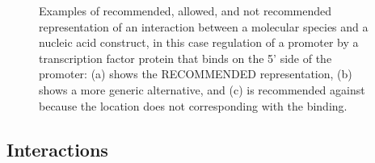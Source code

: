 \begin{enumerate}
	\begin{figure}[h!]
	\centering
	\caption{Examples of recommended, allowed, and not recommended representation of an interaction between a molecular species and a nucleic acid construct, in this case regulation of a promoter by a transcription factor protein that binds on the 5' side of the promoter: 
	(a) shows the RECOMMENDED representation, (b) shows a more generic alternative, and (c) is recommended against because the location does not corresponding with the binding.}
	\label{exa:3}
	\end{figure}

\end{enumerate}


\subsection{Interactions}

